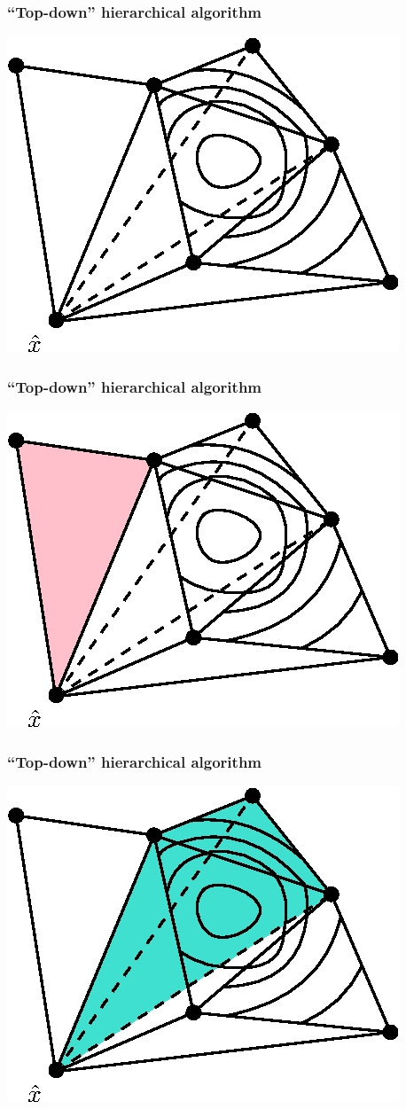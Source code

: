 \documentclass{beamer}
\begin{document}
\begin{frame}
  \frametitle{``Top-down'' hierarchical algorithm}
  \centering
  \includegraphics[width=0.75\linewidth]{top-down-algorithm.eps}
\end{frame}

\begin{frame}
  \frametitle{``Top-down'' hierarchical algorithm}
  \centering
  \includegraphics[width=0.75\linewidth]{top-down-algorithm-1.eps}
\end{frame}

\begin{frame}
  \frametitle{``Top-down'' hierarchical algorithm}
  \centering
  \includegraphics[width=0.75\linewidth]{top-down-algorithm-2.eps}
\end{frame}
\end{document}
